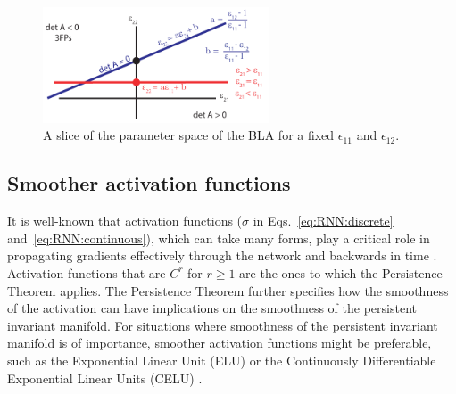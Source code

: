 \documentclass{article} %
\newcounter{ct}
\theoremstyle{definition}
\theoremstyle{remark}
\begin{document}
\begin{figure}[H]
  \centering
  \includegraphics[width=0.6\textwidth]{bla_parameter_space}
  \caption{A slice of the parameter space of the BLA for a fixed \(\epsilon_{11}\) and \(\epsilon_{12}\). %
  }\label{fig:blaparameterspace}
\end{figure}



\subsection{Smoother activation functions}
It is well-known that activation functions (\(\sigma\) in  Eqs.~\ref{eq:RNN:discrete} and~\ref{eq:RNN:continuous}), which can take many forms, play a critical role in propagating gradients effectively through the network and backwards in time \citep{jagtap2023,ramachandran2017,hayou2019}.
Activation functions that are \(C^{r}\) for \(r\geq 1\) are the ones to which the Persistence Theorem applies.
The Persistence Theorem further specifies how the smoothness of the activation can have implications on the smoothness of the persistent invariant manifold.
For situations where smoothness of the persistent invariant manifold is of importance, smoother activation functions might be preferable, such as the Exponential Linear Unit (ELU)\citep{clevert2015} or the Continuously Differentiable Exponential Linear Units (CELU) \citep{barron2017}.








\end{document}
